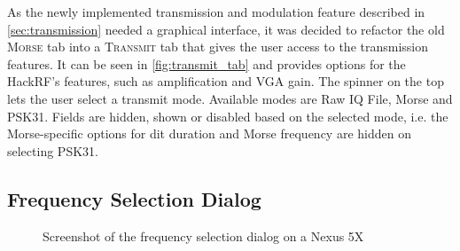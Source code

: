 As the newly implemented transmission and modulation feature described in \autoref{sec:transmission} needed a graphical interface, it was decided to refactor the old \textsc{Morse} tab into a \textsc{Transmit} tab that gives the user access to the transmission features. It can be seen in \autoref{fig:transmit_tab} and provides options for the HackRF's features, such as amplification and \ac{VGA} gain. The spinner on the top lets the user select a transmit mode. Available modes are Raw IQ File, Morse and \ac{PSK31}. Fields are hidden, shown or disabled based on the selected mode, i.e. the Morse-specific options for dit duration and Morse frequency are hidden on selecting \ac{PSK31}.


\subsection{Frequency Selection Dialog\label{sec:freq_dialog}}

\begin{figure}
\centering
{}
\hfill\null
{}
\caption{Screenshot of the frequency selection dialog on a Nexus 5X}
\label{fig:freq_dialog}
\end{figure}

